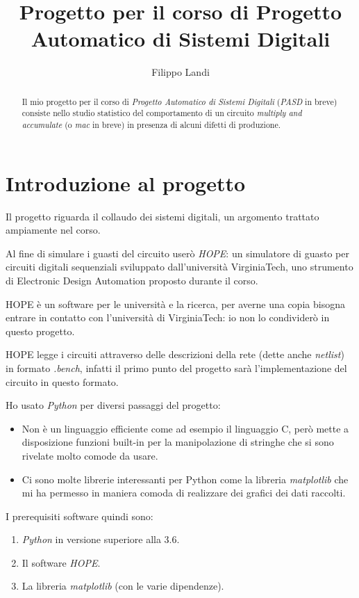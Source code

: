 \documentclass[12pt, letterpaper]{article}
\title{Progetto per il corso di Progetto Automatico di Sistemi Digitali}
\author{Filippo Landi}
\begin{document}
\maketitle

\begin{abstract}
Il mio progetto per il corso di \textit{Progetto Automatico di Sistemi Digitali} (\textit{PASD} in breve) consiste nello studio statistico del comportamento di un circuito \textit{multiply and accumulate} (o \textit{mac} in breve) in presenza di alcuni difetti di produzione.
\end{abstract}

\section{Introduzione al progetto}

Il progetto riguarda il collaudo dei sistemi digitali, un argomento trattato ampiamente nel corso.

Al fine di simulare i guasti del circuito userò \textit{HOPE}: un simulatore di guasto per circuiti digitali sequenziali sviluppato dall'università VirginiaTech, uno strumento di Electronic Design Automation proposto durante il corso.

HOPE è un software per le università e la ricerca, per averne una copia bisogna entrare in contatto con l'università di VirginiaTech: io non lo condividerò in questo progetto.

HOPE legge i circuiti attraverso delle descrizioni della rete (dette anche \textit{netlist}) in formato \textit{.bench}, infatti il primo punto del progetto sarà l'implementazione del circuito in questo formato.

Ho usato \textit{Python} per diversi passaggi del progetto: 
\begin{itemize}
\item Non è un linguaggio efficiente come ad esempio il linguaggio C, però mette a disposizione funzioni built-in per la manipolazione di stringhe che si sono rivelate molto comode da usare.
\item Ci sono molte librerie interessanti per Python come la libreria \textit{matplotlib} che mi ha permesso in maniera comoda di realizzare dei grafici dei dati raccolti.
\end{itemize}

I prerequisiti software quindi sono:
\begin{enumerate} 
\item \textit{Python} in versione superiore alla 3.6.
\item Il software \textit{HOPE}.
\item La libreria \textit{matplotlib} (con le varie dipendenze).
\end{enumerate}
\end{document}
